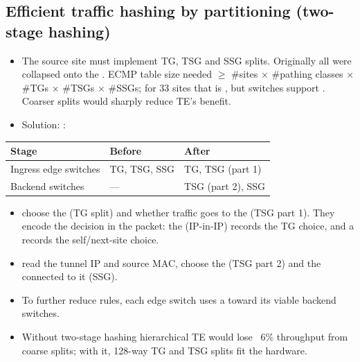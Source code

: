 \subsection{Efficient traffic hashing by partitioning (two-stage hashing)}
\begin{itemize}
\item The source site must implement TG, TSG and SSG splits. Originally all were collapsed onto the . ECMP table size needed $\ge$ \#sites $\times$ \#pathing classes $\times$ \#TGs $\times$ \#TSGs $\times$ \#SSGs; for 33 sites that is , but switches support . Coarser splits would sharply reduce TE's benefit.
\item Solution: :
\end{itemize}
\begin{center}
\begin{tabular}{@{}lll@{}}
\toprule
\textbf{Stage} & \textbf{Before} & \textbf{After} \\
\midrule
Ingress edge switches & TG, TSG, SSG & TG, TSG (part 1) \\
Backend switches & --- & TSG (part 2), SSG \\
\bottomrule
\end{tabular}
\end{center}
\begin{itemize}
\item {} choose the  (TG split) and whether traffic goes to the  (TSG part 1). They encode the decision in the packet: the  (IP-in-IP) records the TG choice, and a  records the self/next-site choice.
\item {} read the tunnel IP and source MAC, choose the  (TSG part 2) and the  connected to it (SSG).
\item To further reduce rules, each edge switch uses a  toward its viable backend switches.
\item Without two-stage hashing hierarchical TE would lose ~6\% throughput from coarse splits; with it, 128-way TG and TSG splits fit the hardware.
\end{itemize}

